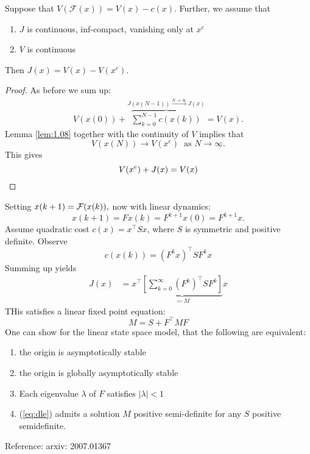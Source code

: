 \begin{proposition}\label{prop:1.12}
    Suppose that \(V(\mathcal{F}(x))=V(x)-c(x)\). Further, we assume that 
    \begin{enumerate}
        \item \(J\) is continuous, inf-compact, vanishing only at \(x^e\)
        \item \(V\) is continuous
    \end{enumerate}
    Then \(J(x)=V(x)-V(x^e)\).
\end{proposition}

\begin{proof}
    As before we sum up:
    \begin{align*}
        V(x(0))+\overbrace{\sum_{k=0}^{N-1}c(x(k))}^{J(x(N-1))\stackrel{N\to\infty}{\to}J(x)}=V(x).
    \end{align*}
    Lemma \ref{lem:1.08} together with the continuity of \(V\) implies that
    \[V(x(N))\to V(x^e)\ \text{ as }N\to\infty.\]
    This gives \[V(x^e)+J(x)=V(x)\qedhere\]
\end{proof}

\begin{example}
    Setting \(x(k+1)=\mathcal{F}(x(k)),\) now with linear dynamics:
    \[x(k+1)=F x(k)=F^{k+1}x(0)=F^{k+1}x.\]
    Assume quadratic cost \(c(x)=x^\intercal S x\), where \(S\) is symmetric and 
    positive definite.
    Observe
    \[c(x(k))=(F^kx)^\intercal S F^k x\]
    Summing up yields 
    \begin{align*}
        J(x)&=x^\intercal \underbrace{\left[\sum_{k=0}^{\infty} (F^k)^\intercal S F^k\right]}_{\eqqcolon M}x
    \end{align*}
    THis satisfies a linear fixed point equation:
    \begin{equation}\label{eq:dle}
        M=S+F^\intercal M F
    \end{equation}
    One can show for the linear state space model, that the following are equivalent:
    \begin{enumerate}
        \item the origin is asymptotically stable 
        \item the origin is globally asymptotically stable 
        \item Each eigenvalue \(\lambda\) of \(F\) satisfies \(|\lambda|<1\)
        \item (\ref{eq:dle}) admits a solution \(M\) positive semi-definite for any \(S\) positive semidefinite.
    \end{enumerate}

    Reference: arxiv: 2007.01367 %

\end{example}

